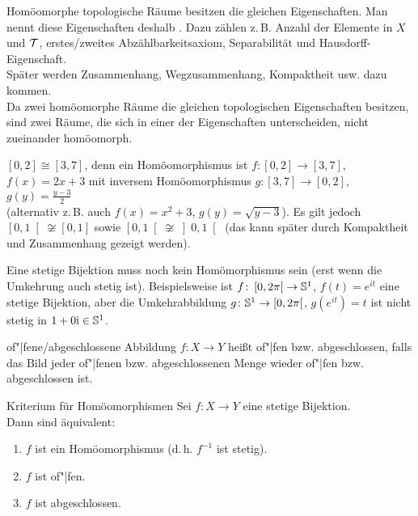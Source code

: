 \begin{Bem}
    Homöomorphe topologische Räume besitzen die gleichen Eigenschaften.
    Man nennt diese Eigenschaften deshalb .
    Dazu zählen z.\,B. Anzahl der Elemente in $X$ und $\mathcal{T}$,
    erstes/zweites Abzählbarkeitsaxiom, Separabilität und
    Hausdorff-Eigenschaft. \\
    Später werden Zusammenhang, Wegzusammenhang, Kompaktheit usw.
    dazu kommen. \\
    Da zwei homöomorphe Räume die gleichen topologischen Eigenschaften
    besitzen, sind zwei Räume, die sich in einer der Eigenschaften
    unterscheiden, nicht zueinander homöomorph.
\end{Bem}

\begin{Bsp}
    $[0,2] \cong [3,7]$, denn ein Homöomorphismus ist
    $f\colon [0,2] \rightarrow [3,7]$, $f(x) = 2x + 3$ mit inversem
    Homöomorphismus $g\colon [3,7] \rightarrow [0,2]$,
    $g(y) = \frac{y - 3}{2}$ \\
    (alternativ z.\,B. auch $f(x) = x^2 + 3$, $g(y) = \sqrt{y - 3}$).
    Es gilt jedoch $\left[0,1\right[ \not\cong [0,1]$ sowie
    $\left[0,1\right[ \not\cong \left]0,1\right[$
    (das kann später durch Kompaktheit und Zusammenhang gezeigt werden).
\end{Bsp}

\begin{Bem}
    Eine stetige Bijektion muss noch kein Homömorphismus sein
    (erst wenn die Umkehrung auch stetig ist).
    Beispielsweise ist $f\colon \left[0, 2\pi\right[ \rightarrow \mathbb{S}^1$,
    $f(t) = e^{it}$ eine stetige Bijektion, aber die Umkehrabbildung
    $g\colon \mathbb{S}^1 \rightarrow \left[0, 2\pi\right[$,
    $g(e^{it}) = t$ ist nicht stetig in $1 + 0\mathrm{i} \in \mathbb{S}^1$.
\end{Bem}

\linie

\begin{Def}{of"|fene/abgeschlossene Abbildung}
    $f\colon X \rightarrow Y$ heißt of"|fen bzw. abgeschlossen, falls das
    Bild jeder of"|fenen bzw. abgeschlossenen Menge wieder of"|fen
    bzw. abgeschlossen ist.
\end{Def}

\begin{Satz}{Kriterium für Homöomorphismen}
    Sei $f\colon X \rightarrow Y$ eine stetige Bijektion. \\
    Dann sind äquivalent:
    \begin{enumerate}
        \item
        $f$ ist ein Homöomorphismus (d.\,h. $f^{-1}$ ist stetig).

        \item
        $f$ ist of"|fen.

        \item
        $f$ ist abgeschlossen.
    \end{enumerate}
\end{Satz}

